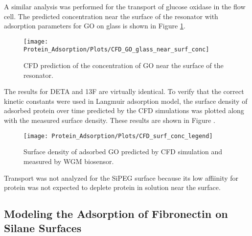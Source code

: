 A similar analysis was performed for the transport of glucose oxidase
in the flow cell. The predicted concentration near the surface of
the resonator with adsorption parameters for GO on glass is shown
in Figure \ref{fig:CFD GO near surf conc}.%
\begin{figure}
\texttt{[image: Protein\_Adsorption/Plots/CFD\_GO\_glass\_near\_surf\_conc]}

\caption{\label{fig:CFD GO near surf conc}CFD prediction of the concentration
of GO near the surface of the resonator.}
%
\end{figure}
 The results for DETA and 13F are virtually identical. To verify that
the correct kinetic constants were used in Langmuir adsorption model,
the surface density of adsorbed protein over time predicted by the
CFD simulations was plotted along with the measured surface density.
These results are shown in Figure .%
\begin{figure}

\texttt{[image: Protein\_Adsorption/Plots/CFD\_surf\_conc\_legend]}\caption{\label{fig:CFD GO surface density}Surface density of adsorbed GO
predicted by CFD simulation and measured by WGM biosensor.}
%
\end{figure}
 Transport was not analyzed for the SiPEG surface because its low
affiinity for protein was not expected to deplete protein in solution
near the surface.


\subsection{Modeling the Adsorption of Fibronectin on Silane Surfaces}

